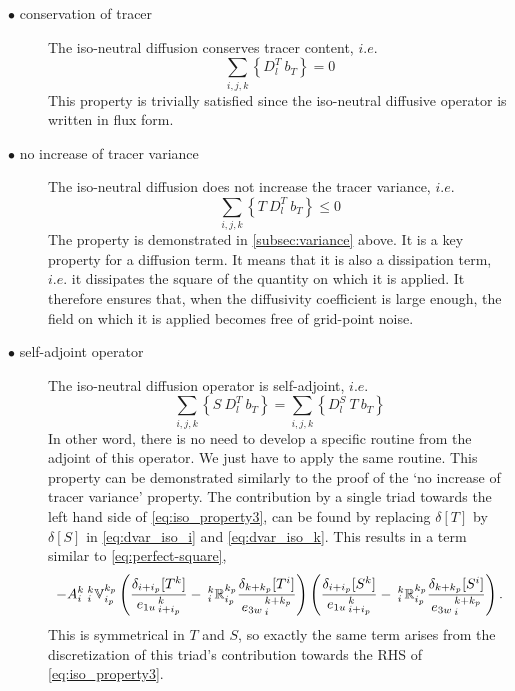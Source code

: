 \documentclass[../tex_main/NEMO_manual]{subfiles}
\begin{document}
\begin{description}
\item[$\bullet$ conservation of tracer]
  The iso-neutral diffusion conserves tracer content, $i.e.$
  \begin{equation} \label{eq:iso_property1} \sum_{i,j,k} \left\{ D_l^T \
      b_T \right\} = 0
  \end{equation}
  This property is trivially satisfied since the iso-neutral diffusive operator is written in flux form.

\item[$\bullet$ no increase of tracer variance]
  The iso-neutral diffusion does not increase the tracer variance, $i.e.$
  \begin{equation} \label{eq:iso_property2} \sum_{i,j,k} \left\{ T \ D_l^T
      \ b_T \right\} \leq 0
  \end{equation}
  The property is demonstrated in \autoref{subsec:variance} above.
  It is a key property for a diffusion term.
  It means that it is also a dissipation term,
  $i.e.$ it dissipates the square of the quantity on which it is applied.
  It therefore ensures that, when the diffusivity coefficient is large enough,
  the field on which it is applied becomes free of grid-point noise.

\item[$\bullet$ self-adjoint operator]
  The iso-neutral diffusion operator is self-adjoint, $i.e.$
  \begin{equation} \label{eq:iso_property3} \sum_{i,j,k} \left\{ S \ D_l^T
      \ b_T \right\} = \sum_{i,j,k} \left\{ D_l^S \ T \ b_T \right\}
  \end{equation}
  In other word, there is no need to develop a specific routine from the adjoint of this operator.
  We just have to apply the same routine.
  This property can be demonstrated similarly to the proof of the `no increase of tracer variance' property.
  The contribution by a single triad towards the left hand side of \autoref{eq:iso_property3},
  can be found by replacing $\delta[T]$ by $\delta[S]$ in \autoref{eq:dvar_iso_i} and \autoref{eq:dvar_iso_k}.
  This results in a term similar to \autoref{eq:perfect-square},
\begin{equation}
  \label{eq:TScovar}
  - {A}_i^k{\:} _i^k\mathbb{V}_{i_p}^{k_p}
  \left(
    \frac{ \delta_{i+ i_p}[T^k] }{ {e_{1u}}_{\,i + i_p}^{\,k} }
    -{\:}_i^k\mathbb{R}_{i_p}^{k_p}
    \frac{ \delta_{k+k_p} [T^i] }{{e_{3w}}_{\,i}^{\,k+k_p} }
  \right)
  \left(
    \frac{ \delta_{i+ i_p}[S^k] }{ {e_{1u}}_{\,i + i_p}^{\,k} }
    -{\:}_i^k\mathbb{R}_{i_p}^{k_p}
    \frac{ \delta_{k+k_p} [S^i] }{{e_{3w}}_{\,i}^{\,k+k_p} }
  \right).
\end{equation}
This is symmetrical in $T $ and $S$, so exactly the same term arises from
the discretization of this triad's contribution towards the RHS of \autoref{eq:iso_property3}.
\end{description}
\end{document}

